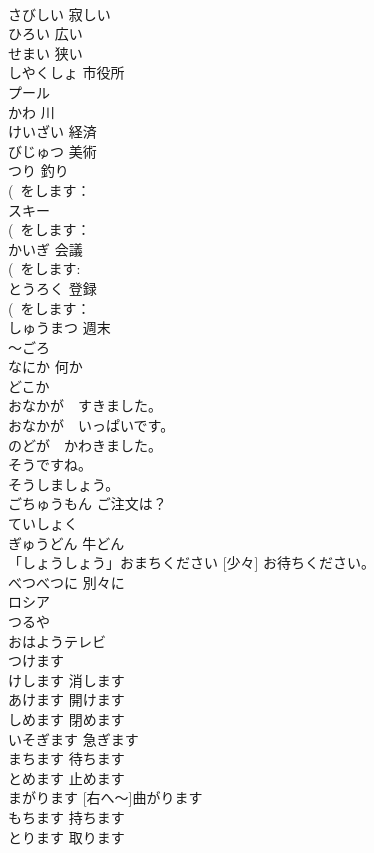 \documentclass[8pt]{extreport}
\begin{document}
\begin{CJK}{UTF8}{min}
\\	さびしい	寂しい	
\\	ひろい	広い	
\\	せまい	狭い	
\\	しやくしょ	市役所	
\\	プール			
\\	かわ	川	
\\	けいざい	経済	
\\	びじゅつ	美術	
\\	つり	釣り	
\\	(~をします：
\\	スキー			
\\	(~をします：
\\	かいぎ	会議	
\\	(~をします: 
\\	とうろく	登録	
\\	(~をします：
\\	しゅうまつ	週末	
\\	～ごろ			
\\	なにか	何か	
\\	どこか			
\\	おなかが　すきました。			
\\	おなかが　いっぱいです。			
\\	のどが　かわきました。			
\\	そうですね。			
\\	そうしましょう。			
\\	ごちゅうもん	ご注文は？	
\\	ていしょく			
\\	ぎゅうどん	牛どん	
\\	「しょうしょう」おまちください	[少々] お待ちください。	
\\	べつべつに	別々に	
\\	ロシア			
\\	つるや			
\\	おはようテレビ			
\\	つけます			
\\	けします	消します	
\\	あけます	開けます	
\\	しめます	閉めます	
\\	いそぎます	急ぎます	
\\	まちます	待ちます	
\\	とめます	止めます	
\\	[みぎへ～] まがります	[右へ～]曲がります	
\\	もちます	持ちます	
\\	とります	取ります	

\end{CJK}
\end{document}
